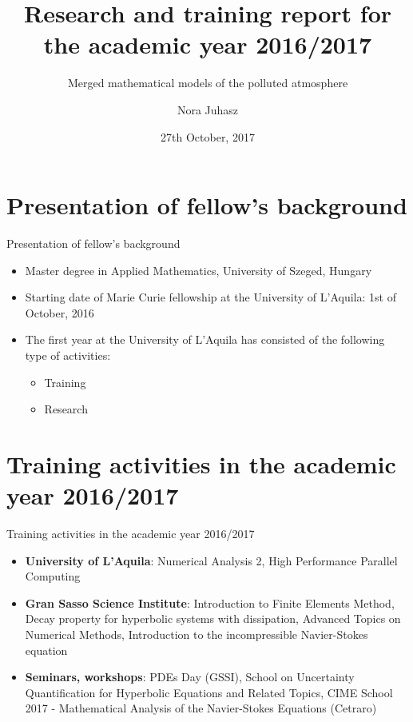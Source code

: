 \documentclass{beamer}
\title{Research and training report for the academic year 2016/2017}
\subtitle{Merged mathematical models of the polluted atmosphere}
\author{Nora Juhasz}
\institute{Department of Information Engineering, Computer Science and Mathematics \\ University of L'Aquila \\ Supervisor: Prof. Donatella Donatelli}
\date{27th October, 2017}
\begin{document}
\begin{frame}
\titlepage
\end{frame}

\section{Presentation of fellow's background}

\begin{frame}{Presentation of fellow's background}
  \begin{itemize}
  \item
    Master degree in Applied Mathematics, University of Szeged, Hungary
  \item
    Starting date of Marie Curie fellowship at the University of L'Aquila: 1st of October, 2016
  \item
    The first year at the University of L'Aquila has consisted of the following type of activities:
    \begin{itemize}
      \item Training
      \item Research
    \end{itemize}
  \end{itemize}
\end{frame}

\section{Training activities in the academic year 2016/2017}

\begin{frame}{Training activities in the academic year 2016/2017}

  \begin{itemize}
  \item
    \textbf{University of L'Aquila}: Numerical Analysis 2, High Performance Parallel Computing
  \item
    \textbf{Gran Sasso Science Institute}: Introduction to Finite Elements Method, Decay property for hyperbolic systems with dissipation, Advanced Topics on Numerical Methods, Introduction to the incompressible Navier-Stokes equation
  \item
    \textbf{Seminars, workshops}: PDEs Day (GSSI), School on Uncertainty Quantification for Hyperbolic Equations and Related Topics, CIME School 2017  - Mathematical Analysis of the Navier-Stokes Equations (Cetraro)
  \end{itemize}
\end{frame}
\end{document}
